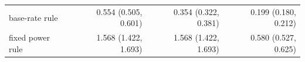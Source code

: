 \begin{tabular}{lrrr}
base-rate rule & 0.554 (0.505, 0.601) & 0.354 (0.322, 0.381) & 0.199 (0.180, 0.212) \\
fixed power rule & 1.568 (1.422, 1.693) & 1.568 (1.422, 1.693) & 0.580 (0.527, 0.625) \\

\end{tabular}
